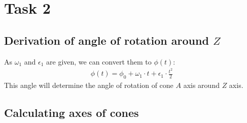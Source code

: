\section{Task 2}

\subsection{Derivation of angle of rotation around $Z$}

As $\omega_1$ and $\epsilon_1$ are given, we can convert them to $\phi(t)$:
\begin{align}
    \phi(t) = \phi_0 + \omega_1 \cdot t + \epsilon_1 \cdot \frac{t^2}{2}
\end{align}
This angle will determine the angle of rotation of cone $A$ axis around $Z$ axis.

\subsection{Calculating axes of cones}

